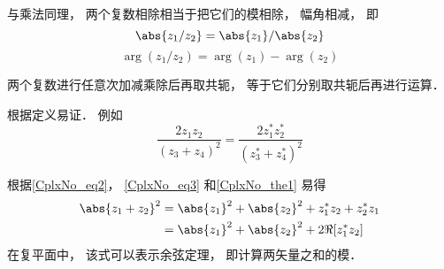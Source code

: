 与乘法同理， 两个复数相除相当于把它们的模相除， 幅角相减， 即
\begin{equation}
\abs{z_1/z_2} = \abs{z_1}/\abs{z_2}
\end{equation}
\begin{equation}
\arg(z_1/z_2) = \arg(z_1) - \arg(z_2)
\end{equation}

\begin{theorem}{}\label{CplxNo_the1}
两个复数进行任意次加减乘除后再取共轭， 等于它们分别取共轭后再进行运算．
\end{theorem}
根据定义易证． 例如
\begin{equation}
\frac{2 z_1 z_2}{(z_3 + z_4)^2} = \frac{2 z_1^* z_2^*}{(z_3^* + z_4^*)^2}
\end{equation}

根据\autoref{CplxNo_eq2}， \autoref{CplxNo_eq3} 和\autoref{CplxNo_the1} 易得
\begin{equation}
\begin{aligned}
\abs{z_1 + z_2}^2 &= \abs{z_1}^2 + \abs{z_2}^2 + z_1^* z_2 + z_2^* z_1\\
&= \abs{z_1}^2 + \abs{z_2}^2 + 2\Re[z_1^* z_2]
\end{aligned}
\end{equation}
在复平面中， 该式可以表示余弦定理， 即计算两矢量之和的模．
